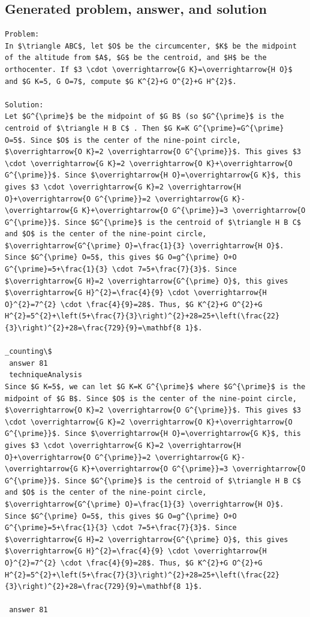 \documentclass[11pt]{article}
\begin{document}
\subsection*{Generated problem, answer, and solution}
\begin{lstlisting}[style=modeloutput]
Problem:
In $\triangle ABC$, let $O$ be the circumcenter, $K$ be the midpoint of the altitude from $A$, $G$ be the centroid, and $H$ be the orthocenter. If $3 \cdot \overrightarrow{G K}=\overrightarrow{H O}$ and $G K=5, G O=7$, compute $G K^{2}+G O^{2}+G H^{2}$.

Solution:
Let $G^{\prime}$ be the midpoint of $G B$ (so $G^{\prime}$ is the centroid of $\triangle H B C$ . Then $G K=K G^{\prime}=G^{\prime} O=5$. Since $O$ is the center of the nine-point circle, $\overrightarrow{O K}=2 \overrightarrow{O G^{\prime}}$. This gives $3 \cdot \overrightarrow{G K}=2 \overrightarrow{O K}+\overrightarrow{O G^{\prime}}$. Since $\overrightarrow{H O}=\overrightarrow{G K}$, this gives $3 \cdot \overrightarrow{G K}=2 \overrightarrow{H O}+\overrightarrow{O G^{\prime}}=2 \overrightarrow{G K}-\overrightarrow{G K}+\overrightarrow{O G^{\prime}}=3 \overrightarrow{O G^{\prime}}$. Since $G^{\prime}$ is the centroid of $\triangle H B C$ and $O$ is the center of the nine-point circle, $\overrightarrow{G^{\prime} O}=\frac{1}{3} \overrightarrow{H O}$. Since $G^{\prime} O=5$, this gives $G O=g^{\prime} O+O G^{\prime}=5+\frac{1}{3} \cdot 7=5+\frac{7}{3}$. Since $\overrightarrow{G H}=2 \overrightarrow{G^{\prime} O}$, this gives $\overrightarrow{G H}^{2}=\frac{4}{9} \cdot \overrightarrow{H O}^{2}=7^{2} \cdot \frac{4}{9}=28$. Thus, $G K^{2}+G O^{2}+G H^{2}=5^{2}+\left(5+\frac{7}{3}\right)^{2}+28=25+\left(\frac{22}{3}\right)^{2}+28=\frac{729}{9}=\mathbf{8 1}$.

_counting\$
 answer 81
 techniqueAnalysis
Since $G K=5$, we can let $G K=K G^{\prime}$ where $G^{\prime}$ is the midpoint of $G B$. Since $O$ is the center of the nine-point circle, $\overrightarrow{O K}=2 \overrightarrow{O G^{\prime}}$. This gives $3 \cdot \overrightarrow{G K}=2 \overrightarrow{O K}+\overrightarrow{O G^{\prime}}$. Since $\overrightarrow{H O}=\overrightarrow{G K}$, this gives $3 \cdot \overrightarrow{G K}=2 \overrightarrow{H O}+\overrightarrow{O G^{\prime}}=2 \overrightarrow{G K}-\overrightarrow{G K}+\overrightarrow{O G^{\prime}}=3 \overrightarrow{O G^{\prime}}$. Since $G^{\prime}$ is the centroid of $\triangle H B C$ and $O$ is the center of the nine-point circle, $\overrightarrow{G^{\prime} O}=\frac{1}{3} \overrightarrow{H O}$. Since $G^{\prime} O=5$, this gives $G O=g^{\prime} O+O G^{\prime}=5+\frac{1}{3} \cdot 7=5+\frac{7}{3}$. Since $\overrightarrow{G H}=2 \overrightarrow{G^{\prime} O}$, this gives $\overrightarrow{G H}^{2}=\frac{4}{9} \cdot \overrightarrow{H O}^{2}=7^{2} \cdot \frac{4}{9}=28$. Thus, $G K^{2}+G O^{2}+G H^{2}=5^{2}+\left(5+\frac{7}{3}\right)^{2}+28=25+\left(\frac{22}{3}\right)^{2}+28=\frac{729}{9}=\mathbf{8 1}$.

 answer 81
\end{lstlisting}
\clearpage
\end{document}
